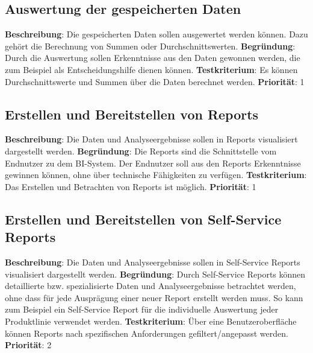 \subsection{Auswertung der gespeicherten Daten} \label{sec:anforderungsspezifikation:datenAuswertung}
\textbf{Beschreibung}: Die gespeicherten Daten sollen ausgewertet werden können. Dazu gehört die Berechnung von Summen oder Durchschnittswerten.
\newline \textbf{Begründung}: Durch die Auswertung sollen Erkenntnisse aus den Daten gewonnen werden, die zum Beispiel als Entscheidungshilfe dienen können.
\newline \textbf{Testkriterium}: Es können Durchschnittswerte und Summen über die Daten berechnet werden.
\newline \textbf{Priorität}: 1

\subsection{Erstellen und Bereitstellen von Reports} \label{sec:anforderungsspezifikation:reports}
\textbf{Beschreibung}: Die Daten und Analyseergebnisse sollen in Reports visualisiert dargestellt werden.
\newline \textbf{Begründung}: Die Reports sind die Schnittstelle vom Endnutzer zu dem BI-System. Der Endnutzer soll aus den Reports Erkenntnisse gewinnen können, ohne über technische Fähigkeiten zu verfügen.
\newline \textbf{Testkriterium}: Das Erstellen und Betrachten von Reports ist möglich.
\newline \textbf{Priorität}: 1

\subsection{Erstellen und Bereitstellen von Self-Service Reports} \label{sec:anforderungsspezifikation:selfServiceReports}
\textbf{Beschreibung}: Die Daten und Analyseergebnisse sollen in Self-Service Reports visualisiert dargestellt werden.
\newline \textbf{Begründung}: Durch Self-Service Reports können detaillierte bzw. spezialisierte Daten und Analyseergebnisse betrachtet werden, ohne dass für jede Ausprägung einer neuer Report erstellt werden muss. So kann zum Beispiel ein Self-Service Report für die individuelle Auswertung jeder Produktlinie verwendet werden.
\newline \textbf{Testkriterium}: Über eine Benutzeroberfläche können Reports nach spezifischen Anforderungen gefiltert/angepasst werden.
\newline \textbf{Priorität}: 2


